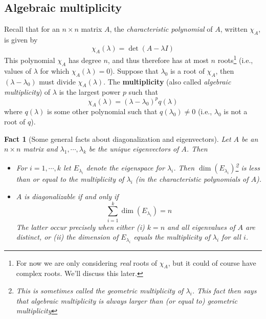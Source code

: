 \documentclass[12pt]{article}
\numberwithin{equation}{subsection}
\numberwithin{figure}{subsection}
\newtheorem{fact}[subsection]{Fact}
\theoremstyle{note}
\begin{document}
\subsection{Algebraic multiplicity} 
Recall that for an $n\times n$ matrix $A$, the \textit{characteristic polynomial} of $A$, written $\chi_A$, is given by \[ \chi_A(\lambda)=\det(A-\lambda I)\]
This polynomial $\chi_A$ has degree $n$, and thus therefore has at most $n$ roots\footnote{For now we are only considering \textit{real} roots of $\chi_A$, but it could of course have complex roots. We'll discuss this later.} (i.e., values of $\lambda$ for which $\chi_A(\lambda)=0$). Suppose that $\lambda_0$ is a root of $\chi_A$, then $(\lambda-\lambda_0)$ must divide $\chi_A(\lambda)$. The \textbf{multiplicity} (also called \textit{algebraic multiplicity}) of $\lambda$ is the largest power $p$ such that \begin{equation} \chi_A(\lambda)=(\lambda-\lambda_0)^p q(\lambda)\end{equation} where $q(\lambda)$ is some other polynomial such that $q(\lambda_0)\neq 0$ (i.e., $\lambda_0$ is not a root of $q$).

\begin{fact}[Some general facts about diagonalization and eigenvectors]
Let $A$ be an $n\times n$ matrix and $\lambda_1,\cdots,\lambda_k$ be the unique eigenvectors of $A$. Then \begin{itemize}
	\item For $i=1,\cdots, k$ let $E_{\lambda_i}$ denote the eigenspace for $\lambda_i$. Then $\dim(E_{\lambda_i})$\footnote{This is sometimes called the \textit{geometric multiplicity} of $\lambda_i$. This fact then says that algebraic multiplicity is always larger than (or equal to) geometric multiplicity} is less than or equal to the multiplicity of $\lambda_i$ (in the characteristic polynomials of $A$).
	\item $A$ is diagonalizable if and only if \[ \sum_{i=1}^k \dim(E_{\lambda_i})=n\] The latter occur precisely when either (i) $k=n$ and all eigenvalues of $A$ are distinct, or (ii) the dimension of $E_{\lambda_i}$ equals the multiplicity of $\lambda_i$ for all $i$. 
\end{itemize}
\end{fact}
\end{document}
